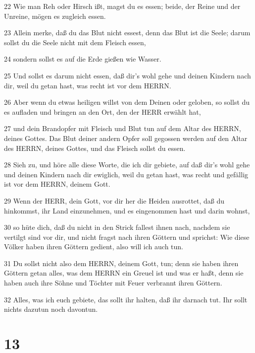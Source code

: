 \par 22 Wie man Reh oder Hirsch ißt, magst du es essen; beide, der Reine und der Unreine, mögen es zugleich essen.
\par 23 Allein merke, daß du das Blut nicht essest, denn das Blut ist die Seele; darum sollst du die Seele nicht mit dem Fleisch essen,
\par 24 sondern sollst es auf die Erde gießen wie Wasser.
\par 25 Und sollst es darum nicht essen, daß dir's wohl gehe und deinen Kindern nach dir, weil du getan hast, was recht ist vor dem HERRN.
\par 26 Aber wenn du etwas heiligen willst von dem Deinen oder geloben, so sollst du es aufladen und bringen an den Ort, den der HERR erwählt hat,
\par 27 und dein Brandopfer mit Fleisch und Blut tun auf dem Altar des HERRN, deines Gottes. Das Blut deiner andern Opfer soll gegossen werden auf den Altar des HERRN, deines Gottes, und das Fleisch sollst du essen.
\par 28 Sieh zu, und höre alle diese Worte, die ich dir gebiete, auf daß dir's wohl gehe und deinen Kindern nach dir ewiglich, weil du getan hast, was recht und gefällig ist vor dem HERRN, deinem Gott.
\par 29 Wenn der HERR, dein Gott, vor dir her die Heiden ausrottet, daß du hinkommst, ihr Land einzunehmen, und es eingenommen hast und darin wohnst,
\par 30 so hüte dich, daß du nicht in den Strick fallest ihnen nach, nachdem sie vertilgt sind vor dir, und nicht fragst nach ihren Göttern und sprichst: Wie diese Völker haben ihren Göttern gedient, also will ich auch tun.
\par 31 Du sollst nicht also dem HERRN, deinem Gott, tun; denn sie haben ihren Göttern getan alles, was dem HERRN ein Greuel ist und was er haßt, denn sie haben auch ihre Söhne und Töchter mit Feuer verbrannt ihren Göttern.
\par 32 Alles, was ich euch gebiete, das sollt ihr halten, daß ihr darnach tut. Ihr sollt nichts dazutun noch davontun.

\chapter{13}

